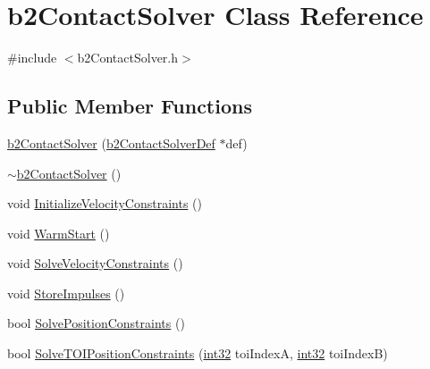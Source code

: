 \hypertarget{classb2_contact_solver}{}\section{b2\+Contact\+Solver Class Reference}
\label{classb2_contact_solver}


{\ttfamily \#include $<$b2\+Contact\+Solver.\+h$>$}

\subsection*{Public Member Functions}
\begin{DoxyCompactItemize}
\item 
\mbox{\hyperlink{classb2_contact_solver_ac89198165ed16eb6080d84f93229ea88}{b2\+Contact\+Solver}} (\mbox{\hyperlink{structb2_contact_solver_def}{b2\+Contact\+Solver\+Def}} $\ast$def)
\item 
\mbox{\hyperlink{classb2_contact_solver_a7a0c4249a7af3bd2c990dabc75096a47}{$\sim$b2\+Contact\+Solver}} ()
\item 
void \mbox{\hyperlink{classb2_contact_solver_a56fc9a51a49879dc2dadd5c33ed70b0c}{Initialize\+Velocity\+Constraints}} ()
\item 
void \mbox{\hyperlink{classb2_contact_solver_aa96052cd2f709bfc416148fefb028522}{Warm\+Start}} ()
\item 
void \mbox{\hyperlink{classb2_contact_solver_abec74e1246fdbfddbd2236602da63e1f}{Solve\+Velocity\+Constraints}} ()
\item 
void \mbox{\hyperlink{classb2_contact_solver_aff5922a65bb5ccf473c425719bb8938d}{Store\+Impulses}} ()
\item 
bool \mbox{\hyperlink{classb2_contact_solver_a4696834a137001bc74faec643b117031}{Solve\+Position\+Constraints}} ()
\item 
bool \mbox{\hyperlink{classb2_contact_solver_a6604c8fc034f89ad2e3461f4b5c20844}{Solve\+T\+O\+I\+Position\+Constraints}} (\mbox{\hyperlink{b2_settings_8h_a43d43196463bde49cb067f5c20ab8481}{int32}} toi\+IndexA, \mbox{\hyperlink{b2_settings_8h_a43d43196463bde49cb067f5c20ab8481}{int32}} toi\+IndexB)
\end{DoxyCompactItemize}
